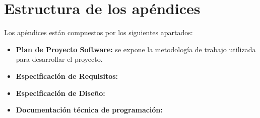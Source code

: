 \section{Estructura de los apéndices}
Los apéndices están compuestos por los siguientes apartados:
\begin{itemize}
	\item \textbf{Plan de Proyecto Software:} se expone la metodología de trabajo utilizada para desarrollar el proyecto.
	\item \textbf{Especificación de Requisitos:}
	\item \textbf{Especificación de Diseño:}
	\item \textbf{Documentación técnica de programación:}
	
\end{itemize}
